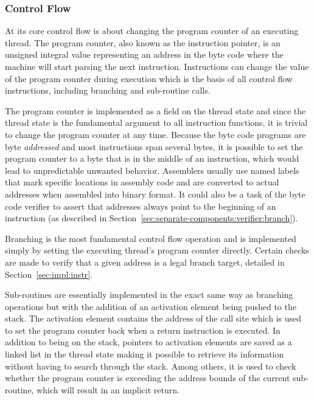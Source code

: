 \subsubsection{Control Flow}
\label{sec:implementation:instr:control-flow}

At its core control flow is about changing the program counter of an executing
thread. The program counter, also known as the instruction pointer, is an
unsigned integral value representing an address in the byte code where the
machine will start parsing the next instruction. Instructions can change the
value of the program counter during execution which is the basis of all control
flow instructions, including branching and sub-routine calls.

The program counter is implemented as a field on the thread state and since the
thread state is the fundamental argument to all instruction functions, it is
trivial to change the program counter at any time. Because the byte code
programs are byte \textit{addressed} and most instructions span several bytes,
it is possible to set the program counter to a byte that is in the middle of an
instruction, which would lead to unpredictable unwanted behavior. Assemblers
usually use named labels that mark specific locations in assembly code and are
converted to actual addresses when assembled into binary format. It could also
be a task of the byte code verifier to assert that addresses always point to the
beginning of an instruction (as described in
Section~\ref{sec:separate-components:verifier:branch}).

Branching is the most fundamental control flow operation and is implemented
simply by setting the executing thread's program counter directly. Certain
checks are made to verify that a given address is a legal branch target,
detailed in Section~\ref{sec:impl:instr}.

Sub-routines are essentially implemented in the exact same way as branching
operations but with the addition of an activation element being pushed to the
stack. The activation element contains the address of the call site which is
used to set the program counter back when a return instruction is executed. In
addition to being on the stack, pointers to activation elements are saved as a
linked list in the thread state making it possible to retrieve its information
without having to search through the stack. Among others, it is used to check
whether the program counter is exceeding the address bounds of the current
sub-routine, which will result in an implicit return. %


